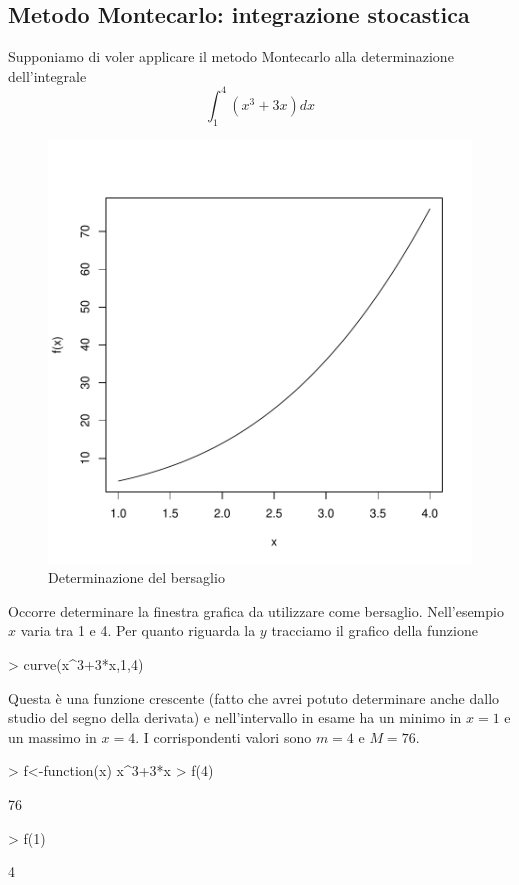 \documentclass[onecolumn,11pt]{book}
\begin{document}
\subsection{Metodo Montecarlo: integrazione stocastica}
Supponiamo di voler applicare il metodo Montecarlo alla determinazione dell'integrale
\begin{equation*}
\int_1^4{ (x^3+3x)dx}
\end{equation*}
\begin{figure}[htbp]
\begin{center}
\includegraphics{Rmatematica-155}
\caption{Determinazione del bersaglio}
\label{fig:dgefault}
\end{center}
\end{figure}

Occorre determinare la finestra grafica da utilizzare come bersaglio.
Nell'esempio $x$ varia tra 1 e 4.
Per quanto riguarda la  $y$  tracciamo il grafico della funzione

\begin{Schunk}
\begin{Sinput}
> curve(x^3+3*x,1,4)
\end{Sinput}
\end{Schunk}
Questa \`e una funzione crescente (fatto che avrei potuto determinare anche dallo studio del segno della derivata) e nell'intervallo in esame ha un minimo  in $x=1$ e un massimo in $x=4$. I corrispondenti valori sono $m=4$ e $M=76$.
\begin{Schunk}
\begin{Sinput}
> f<-function(x) x^3+3*x
> f(4)
\end{Sinput}
\begin{Soutput}
[1] 76
\end{Soutput}
\begin{Sinput}
> f(1)
\end{Sinput}
\begin{Soutput}
[1] 4
\end{Soutput}
\end{Schunk}
\end{document}
